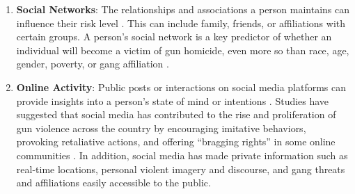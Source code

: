 \documentclass[11pt]{article}
\begin{document}
\begin{enumerate}
\item \textbf{Social Networks}: The relationships and associations a person maintains can influence their risk level \cite{tracy2016transmission,Mcdonald2013-ji,papachristos2014network}. This can include family, friends, or affiliations with certain groups. A person's social network is a key predictor of whether an individual will become a victim of gun homicide, even more so than race, age, gender, poverty, or gang affiliation \cite{Mcdonald2013-ji,papachristos2014network}.

\item \textbf{Online Activity}: Public posts or interactions on social media platforms can provide insights into a person's state of mind or intentions \cite{Written_Bynbsp_Dr2023-zu}. Studies have suggested that social media has contributed to the rise and proliferation of gun violence across the country by encouraging imitative behaviors, provoking retaliative actions, and offering ``bragging rights'' in some online communities \cite{Written_Bynbsp_Dr2023-zu}. In addition, social media has made private information such as real-time locations, personal violent imagery and discourse, and gang threats and affiliations easily accessible to the public.
\end{enumerate}
\end{document}
